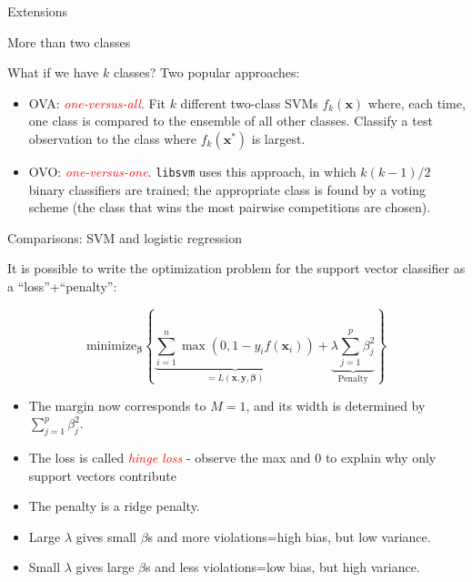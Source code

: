 \documentclass[10pt,ignorenonframetext,]{beamer}
\begin{document}
\begin{frame}[fragile]{Extensions}
\protect\hypertarget{extensions}{}

\begin{block}{More than two classes}

\vspace{2mm}

What if we have \(k\) classes? Two popular approaches: \vspace{1mm}

\begin{itemize}
\item
  OVA: \emph{\textcolor{red}{one-versus-all}}. Fit \(k\) different
  two-class SVMs \(f_k({\boldsymbol x})\) where, each time, one class is
  compared to the ensemble of all other classes. Classify a test
  observation to the class where \(f_k({\boldsymbol x}^*)\) is largest.
\item
  OVO: \emph{\textcolor{red}{one-versus-one}}. \texttt{libsvm} uses this
  approach, in which \(k(k-1)/2\) binary classifiers are trained; the
  appropriate class is found by a voting scheme (the class that wins the
  most pairwise competitions are chosen).
\end{itemize}

\end{block}

\end{frame}

\begin{frame}{Comparisons: SVM and logistic regression}
\protect\hypertarget{comparisons-svm-and-logistic-regression}{}

It is possible to write the optimization problem for the support vector
classifier as a ``loss''+``penalty'':

\[\text{minimize}_{\boldsymbol \beta} \left\{ \underbrace{\sum_{i=1}^n \max(0,1-y_i f({\boldsymbol x}_i))}_{=L(\boldsymbol x, \boldsymbol{y},\boldsymbol\beta)}+ \underbrace{\lambda \sum_{j=1}^p \beta_j^2}_{\text{Penalty}} \right\}\]

\begin{itemize}
\item
  The margin now corresponds to \(M=1\), and its width is determined by
  \(\sum_{j=1}^p \beta_j^2\).
\item
  The loss is called \emph{\textcolor{red}{hinge loss}} - observe the
  max and 0 to explain why only support vectors contribute
\item
  The penalty is a ridge penalty.
\item
  Large \(\lambda\) gives small \(\beta\)s and more violations=high
  bias, but low variance.
\item
  Small \(\lambda\) gives large \(\beta\)s and less violations=low bias,
  but high variance.
\end{itemize}

\end{frame}
\end{document}
